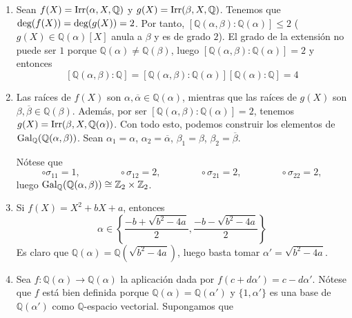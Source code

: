 \documentclass[11pt]{report}
\makeatletter
\renewenvironment{proof}[1][\proofname]{\par
  \pushQED{\qed}%
  \normalfont \topsep\z@skip %
  \trivlist
  \item[\hskip\labelsep
        \itshape
    #1\@addpunct{.}]\ignorespaces
}{%
  \popQED\endtrivlist\@endpefalse
}
\newcommand{\Z}{\mathbb Z}
\newcommand{\Q}{\mathbb Q}
\makeatother
\begin{document}
\begin{proof}
    \hfill
    \begin{enumerate}
        \item Sean $f(X)=\textup{Irr}(\alpha,X,\Q)$ y $g(X)=\textup{Irr}(\beta,X,\Q)$. Tenemos que $\textup{deg}(f(X)) = \textup{deg}(g(X)) = 2$. Por tanto, $[\Q(\alpha,\beta) \colon \Q(\alpha)] \leq 2$ ($g(X) \in \Q(\alpha)[X]$ anula a $\beta$ y es de grado $2$). El grado de la extensión no puede ser $1$ porque $\Q(\alpha) \neq \Q(\beta)$, luego $[\Q(\alpha,\beta) \colon \Q(\alpha)] = 2$ y entonces
        \[[\Q(\alpha,\beta) \colon \Q] = [\Q(\alpha,\beta) \colon \Q(\alpha)] [\Q(\alpha) \colon \Q] = 4\]
        \item Las raíces de $f(X)$ son $\alpha,\overline{\alpha} \in \Q(\alpha)$, mientras que las raíces de $g(X)$ son $\beta,\overline{\beta} \in \Q(\beta)$. Además, por ser $[\Q(\alpha,\beta) \colon \Q(\alpha)] = 2$, tenemos $g(X)=\textup{Irr}(\beta,X,\Q(\alpha))$. Con todo esto, podemos construir los elementos de $\textup{Gal}_\Q(\Q(\alpha,\beta))$. Sean $\alpha_1=\alpha$, $\alpha_2=\overline{\alpha}$, $\beta_1=\beta$, $\beta_2=\overline{\beta}$.
        \begin{center}
            \end{center}
    Nótese que
    \[\circ \sigma_{11} = 1, \qquad \qquad \circ \sigma_{12} = 2, \qquad \qquad \circ \sigma_{21} = 2, \qquad \qquad \circ \sigma_{22} = 2, \]
    luego $\textup{Gal}_\Q(\Q(\alpha,\beta)) \cong \Z_2 \times \Z_2$.
    \item Si $f(X)=X^2+bX+a$, entonces
    \[\alpha \in \left\{\frac{-b+\sqrt{b^2-4a}}{2}, \frac{-b-\sqrt{b^2-4a}}{2}\right\}\]
    Es claro que $\Q(\alpha) = \Q(\sqrt{b^2-4a})$, luego basta tomar $\alpha'=\sqrt{b^2-4a}$.
    \item Sea $f \colon \Q(\alpha) \to \Q(\alpha)$ la aplicación dada por $f(c+d\alpha') = c-d\alpha'$. Nótese que $f$ está bien definida porque $\Q(\alpha) = \Q(\alpha')$ y $\{1,\alpha'\}$ es una base de $\Q(\alpha')$ como $\Q$-espacio vectorial. Supongamos que

\end{enumerate}
\end{proof}
\end{document}
